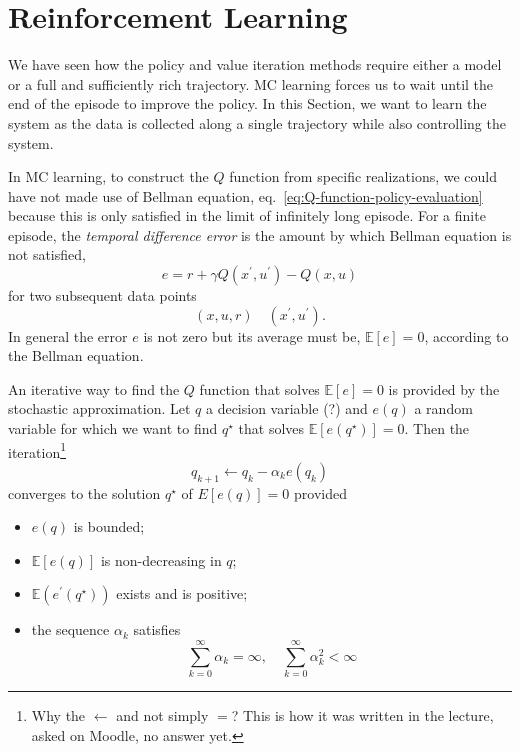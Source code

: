 \chapter{Reinforcement Learning}
\label{chap:r-learning}

We have seen how the policy and value iteration methods require either a model or a full and sufficiently rich trajectory. MC learning forces us to wait until the end of the episode to improve the policy. In this Section, we want to learn the system as the data is collected along a single trajectory while also controlling the system.

In MC learning, to construct the $Q$ function from specific realizations, we could have not made use of Bellman equation, eq.~\eqref{eq:Q-function-policy-evaluation} because this is only satisfied in the limit of infinitely long episode. For a finite episode, the \emph{temporal difference error} is the amount by which Bellman equation is not satisfied,
\begin{equation}
  \label{eq:TD-error}
  e = r + \gamma Q(x^\prime,u^\prime) - Q(x,u)
\end{equation}
for two subsequent data points
\begin{equation*}
  (x,u,r)\quad (x^\prime,u^\prime).
\end{equation*}
In general the error $e$ is not zero but its average must be, $\mathbb{E}[e] = 0$, according to the Bellman equation.

An iterative way to find the $Q$ function that solves $\mathbb{E}[e] = 0$ is provided by the stochastic approximation. Let $q$ a decision variable (?) and $e(q)$ a random variable for which we want to find $q^\star$ that solves $\mathbb{E}[e(q^\star)]=0$. Then the iteration\footnote{Why the $\leftarrow$ and not simply $=$? This is how it was written in the lecture, asked on Moodle, no answer yet.}
\begin{equation}
  \label{eq:TD-error-iterative-solution}
  q_{k+1} \leftarrow q_k -\alpha_k e(q_k)
\end{equation}
converges to the solution $q^\star$ of $E[e(q)]=0$ provided
\begin{itemize}
\item $e(q)$ is bounded;
\item $\mathbb{E}[e(q)]$ is non-decreasing in $q$;
\item $\mathbb{E}(e^\prime(q^\star))$ exists and is positive;
\item the sequence $\alpha_k$ satisfies
  \begin{equation*}
    \sum_{k=0}^\infty \alpha_k = \infty, \quad \sum_{k=0}^\infty \alpha_k^2 < \infty
  \end{equation*}
\end{itemize}

